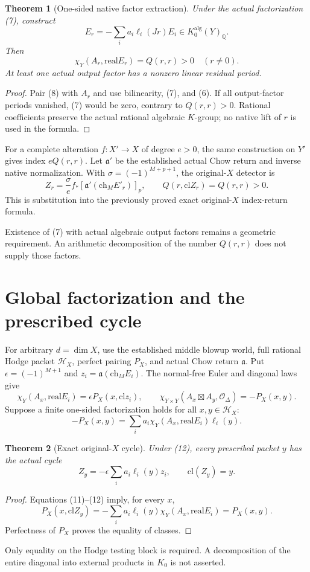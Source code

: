 \documentclass[11pt]{article}
\newcommand{\Q}{\mathbb Q}
\newcommand{\cl}{\mathrm{cl}}
\newcommand{\ch}{\mathrm{ch}}
\newcommand{\real}{\mathrm{real}}
\newtheorem{theorem}{Theorem}
\begin{document}
\begin{theorem}[One-sided native factor extraction]
Under the actual factorization (7), construct
\[
 \boxed{E_r=-\sum_i a_i\ell_i(Jr)E_i
                    \in K_0^{\mathrm{alg}}(Y)_\Q.}              \tag{8}
\]
Then
\[
 \boxed{\chi_Y(A_r,\real E_r)=Q(r,r)>0\quad(r\ne0).}              \tag{9}
\]
At least one actual output factor has a nonzero linear residual period.
\end{theorem}
\begin{proof}
Pair (8) with $A_r$ and use bilinearity, (7), and (6).
If all output-factor periods vanished, (7) would be zero,
contrary to $Q(r,r)>0$. Rational coefficients preserve the
actual rational algebraic $K$-group; no native lift of $r$
is used in the formula.
\end{proof}

For a complete alteration $f:X'\to X$ of degree $e>0$,
the same construction on $Y'$ gives index $eQ(r,r)$.
Let $\mathfrak a'$ be the established actual Chow return
and inverse native normalization. With
$\sigma=(-1)^{M+p+1}$, the original-$X$ detector is
\[
 \boxed{Z_r=\frac{\sigma}{e}
      f_*\left[\mathfrak a'(\ch_M E'_r)\right]_p,\qquad
          Q(r,\cl Z_r)=Q(r,r)>0.}                             \tag{10}
\]
This is substitution into the previously proved exact
original-$X$ index-return formula.

Existence of (7) with actual algebraic output factors remains
a geometric requirement. An arithmetic decomposition of the
number $Q(r,r)$ does not supply those factors.

\section{Global factorization and the prescribed cycle}
For arbitrary $d=\dim X$, use the established middle blowup
world, full rational Hodge packet $\mathcal H_X$, perfect
pairing $P_X$, and actual Chow return $\mathfrak a$.
Put $\epsilon=(-1)^{M+1}$ and
$z_i=\mathfrak a(\ch_M E_i)$.
The normal-free Euler and diagonal laws give
\[
 \chi_Y(A_x,\real E_i)=\epsilon P_X(x,\cl z_i),\qquad
 \chi_{Y\times Y}(A_x\boxtimes A_y,\mathcal O_\Delta)
       =-P_X(x,y).                                             \tag{11}
\]
Suppose a finite one-sided factorization holds for all
$x,y\in\mathcal H_X$:
\[
 -P_X(x,y)=\sum_i a_i\chi_Y(A_x,\real E_i)\ell_i(y).              \tag{12}
\]
\begin{theorem}[Exact original-$X$ cycle]
Under (12), every prescribed packet $y$ has the actual cycle
\[
 \boxed{Z_y=-\epsilon\sum_i a_i\ell_i(y)z_i,\qquad
                         \cl(Z_y)=y.}                         \tag{13}
\]
\end{theorem}
\begin{proof}
Equations (11)--(12) imply, for every $x$,
\[
 P_X(x,\cl Z_y)
   =-\sum_i a_i\ell_i(y)\chi_Y(A_x,\real E_i)=P_X(x,y).
\]
Perfectness of $P_X$ proves the equality of classes.
\end{proof}
Only equality on the Hodge testing block is required.
A decomposition of the entire diagonal into external products
in $K_0$ is not asserted.
\end{document}
